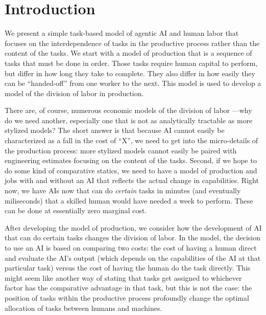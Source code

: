 \documentclass{article}
\theoremstyle{plain}
\theoremstyle{plain}
\begin{document}
\onehalfspacing
  
\section{Introduction}
We present a simple task-based model of agentic AI and human labor that focuses on the interdependence of tasks in the productive process rather than the content of the tasks.
We start with a model of production that is a sequence of tasks that must be done in order.
Those tasks require human capital to perform, but differ in how long they take to complete.
They also differ in how easily they can be ``handed-off'' from one worker to the next.
This model is used to develop a model of the division of labor in production.

There are, of course, numerous economic models of the division of labor \citep{becker1992division, deming2017growing}---why do we need another, especially one that is not as analytically tractable as more stylized models?
The short answer is that because AI cannot easily be characterized as a fall in the cost of ``X'', we need to get into the micro-details of the production process: more stylized models cannot easily be paired with engineering estimates focusing on the content of the tasks. 
Second, if we hope to do some kind of comparative statics, we need to have a model of production and jobs with and without an AI that reflects the actual change in capabilities.
Right now, we have AIs now that can do \emph{certain} tasks in minutes (and eventually miliseconds) that a skilled human would have needed a week to perform. 
These can be done at essentially zero marginal cost. 

After developing the model of production, we consider how the development of AI that can do certain tasks changes the division of labor.
In the model, the decision to use an AI is based on comparing two costs: the cost of having a human direct and evaluate the AI's output (which depends on the capabilities of the AI at that particular task) versus the cost of having the human do the task directly.
This might seem like another way of stating that tasks get assigned to whichever factor has the comparative advantage in that task, but this is not the case: the position of tasks within the productive process profoundly change the optimal allocation of tasks between humans and machines.
\end{document}
